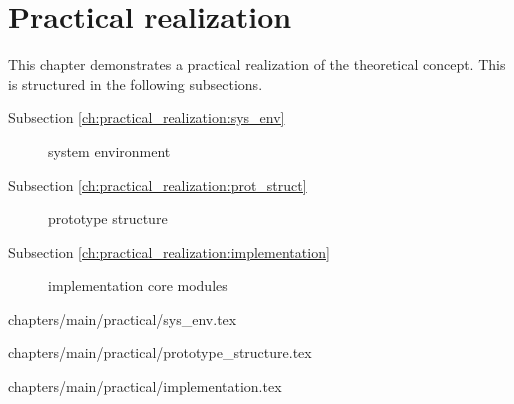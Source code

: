 \chapter{Practical realization}
\label{ch:practical_realization}
This chapter demonstrates a practical realization of the theoretical concept. This is structured in the following subsections.
\begin{description}
\item [Subsection \ref{ch:practical_realization:sys_env}] system environment 
\item [Subsection \ref{ch:practical_realization:prot_struct}] prototype structure
\item [Subsection \ref{ch:practical_realization:implementation}] implementation core modules
\end{description}

 {chapters/main/practical/sys_env.tex}		

 {chapters/main/practical/prototype_structure.tex}

 {chapters/main/practical/implementation.tex}
